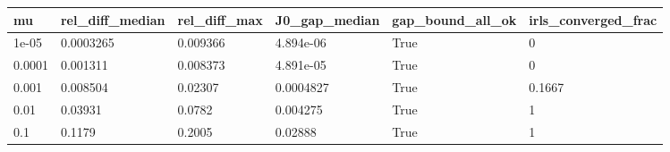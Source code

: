 \begin{tabular}{llllll}
\hline
mu & rel\_diff\_median & rel\_diff\_max & J0\_gap\_median & gap\_bound\_all\_ok & irls\_converged\_frac \\
\hline
1e-05 & 0.0003265 & 0.009366 & 4.894e-06 & True & 0 \\
0.0001 & 0.001311 & 0.008373 & 4.891e-05 & True & 0 \\
0.001 & 0.008504 & 0.02307 & 0.0004827 & True & 0.1667 \\
0.01 & 0.03931 & 0.0782 & 0.004275 & True & 1 \\
0.1 & 0.1179 & 0.2005 & 0.02888 & True & 1 \\
\hline
\end{tabular}
